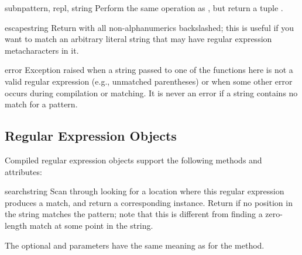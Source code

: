 \begin{funcdesc}{subn}{pattern, repl, string}
Perform the same operation as , but return a tuple
.
\end{funcdesc}

\begin{funcdesc}{escape}{string}
  Return  with all non-alphanumerics backslashed; this is
  useful if you want to match an arbitrary literal string that may have
  regular expression metacharacters in it.
\end{funcdesc}

\begin{excdesc}{error}
  Exception raised when a string passed to one of the functions here
  is not a valid regular expression (e.g., unmatched parentheses) or
  when some other error occurs during compilation or matching.  It is
  never an error if a string contains no match for a pattern.
\end{excdesc}


\subsection{Regular Expression Objects \label{re-objects}}

Compiled regular expression objects support the following methods and
attributes:

\begin{methoddesc}[RegexObject]{search}{string}
  Scan through  looking for a location where this regular
  expression produces a match, and return a
  corresponding  instance.  Return  if no
  position in the string matches the pattern; note that this is
  different from finding a zero-length match at some point in the string.
  
  The optional  and  parameters have the same
  meaning as for the  method.
\end{methoddesc}

